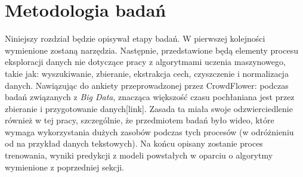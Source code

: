 
\chapter{Metodologia badań}
Niniejszy rozdział będzie opisywał etapy badań. W pierwszej kolejności wymienione zostaną narzędzia. Następnie, przedstawione będą elementy procesu eksploracji danych nie dotyczące pracy z algorytmami uczenia maszynowego, takie jak: wyszukiwanie, zbieranie, ekstrakcja cech, czyszczenie i normalizacja danych. Nawiązując do ankiety przeprowadzonej przez CrowdFlower: podczas badań związanych z {\em Big Data}, znacząca większość czasu pochłaniana jest przez zbieranie i przygotowanie danych[link]. Zasada ta miała swoje odzwierciedlenie również w tej pracy, szczególnie, że przedmiotem badań było wideo, które wymaga wykorzystania dużych zasobów podczas tych procesów (w odróżnieniu od na przykład danych tekstowych). Na końcu opisany zostanie proces trenowania, wyniki predykcji z modeli powstałych w oparciu o algorytmy wymienione z poprzedniej sekcji.
\label{cha:pierwszyDokument}

